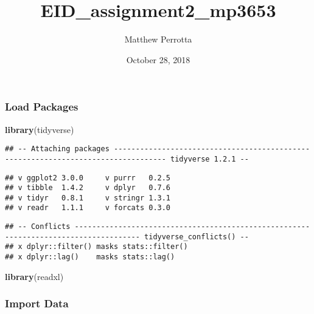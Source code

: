 \documentclass[]{article}
\title{EID\_assignment2\_mp3653}
\author{Matthew Perrotta}
\date{October 28, 2018}
\newenvironment{Shaded}{\begin{snugshade}}{\end{snugshade}}
\newcommand{\KeywordTok}[1]{\textcolor[rgb]{0.13,0.29,0.53}{\textbf{#1}}}
\newcommand{\DataTypeTok}[1]{\textcolor[rgb]{0.13,0.29,0.53}{#1}}
\newcommand{\StringTok}[1]{\textcolor[rgb]{0.31,0.60,0.02}{#1}}
\newcommand{\OperatorTok}[1]{\textcolor[rgb]{0.81,0.36,0.00}{\textbf{#1}}}
\newcommand{\NormalTok}[1]{#1}
\begin{document}
\maketitle

\subsubsection{Load Packages}\label{load-packages}

\begin{Shaded}
\begin{Highlighting}[]
\KeywordTok{library}\NormalTok{(tidyverse)}
\end{Highlighting}
\end{Shaded}

\begin{verbatim}
## -- Attaching packages ---------------------------------------------------------------------------------- tidyverse 1.2.1 --
\end{verbatim}

\begin{verbatim}
## v ggplot2 3.0.0     v purrr   0.2.5
## v tibble  1.4.2     v dplyr   0.7.6
## v tidyr   0.8.1     v stringr 1.3.1
## v readr   1.1.1     v forcats 0.3.0
\end{verbatim}

\begin{verbatim}
## -- Conflicts ------------------------------------------------------------------------------------- tidyverse_conflicts() --
## x dplyr::filter() masks stats::filter()
## x dplyr::lag()    masks stats::lag()
\end{verbatim}

\begin{Shaded}
\begin{Highlighting}[]
\KeywordTok{library}\NormalTok{(readxl)}
\end{Highlighting}
\end{Shaded}

\subsubsection{Import Data}\label{import-data}

\begin{Shaded}
\end{Shaded}
\end{document}
